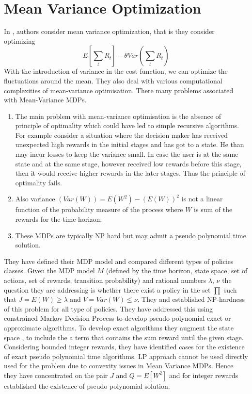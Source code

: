\documentclass[11pt,a4paper,oneside]{report}
\begin{document}
\section{Mean Variance Optimization}
In \cite{mannor2011mean}, authors consider mean variance optimization, that is they consider optimizing 
\begin{equation}
E[\sum_t R_t] - \theta Var(\sum_t R_t)
\end{equation}
With the introduction of variance in the cost function, we can optimize the fluctuations around the mean. They also deal with various computational complexities of mean-variance optimisation. There many problems associated with Mean-Variance MDPs.
\begin{enumerate}
\item The main problem with mean-variance optimisation is the absence of principle of optimality which could have led to simple recursive algorithms. For example consider a situation where the decision maker has received unexpected high rewards in the initial stages and has got to a state. He than may incur losses to keep the variance small. In case the user is at the same state and at the same stage, however received low rewards before this stage, then it would receive higher rewards in the later stages. Thus the principle of optimality fails. 
\item Also variance $ (Var(W))=E(W^2)- (E(W))^2$ is not a linear function of the probability measure of the process where $W$ is sum of the rewards for the time horizon.
\item These MDPs are typically NP hard but may admit a pseudo polynomial time solution.
\end{enumerate} 
They have defined their MDP model and compared different types of policies classes. Given the MDP model $M$ (defined by the time horizon, state space, set of actions, set of rewards, transition probability) and rational numbers $\lambda$, $\nu$ the question they are addressing is whether there exist a policy in the set  ${\prod}$ such that $J=E(W)\geq \lambda$ and $V=Var(W)\leq \nu$. They  and established NP-hardness of this problem for all type of policies. They have addressed this using constrained Markov Decision Process to develop pseudo polynomial exact or approximate algorithms.
To develop exact algorithms they augment the state space , to include the a term that contains the sum reward until the given stage. Considering bounded integer rewards, they have identified cases for the existence of exact pseudo polynomial time algorithms.  LP approach cannot be used directly used for the problem due to convexity issues in Mean Variance MDPs. Hence they have concentrated on the pair $J$ and $Q = E[W^2]$ and for integer rewards established the existence of pseudo polynomial solution.
\end{document}
